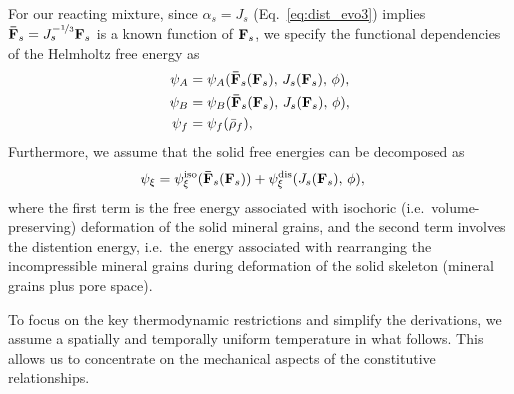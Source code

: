\documentclass[11pt]{article}
\begin{document}
For our reacting mixture, since $\alpha_s = J_s$ (Eq.~\eqref{eq:dist_evo3}) implies $\mathbf{\bar F}_s = J_s^{-\nicefrac{1}{3}} \mathbf{F}_s$ is a known function of $\mathbf{F}_s$, we specify the functional dependencies of the Helmholtz free energy as
%
\begin{align*}
  \psi_A &= \psi_A(\mathbf{\bar F}_s(\mathbf{F}_s),\, J_s(\mathbf{F}_s),\, \phi), \\
  \psi_B &= \psi_B(\mathbf{\bar F}_s(\mathbf{F}_s),\, J_s(\mathbf{F}_s),\, \phi), \\
  \psi_f &= \psi_f(\bar\rho_f),
\end{align*}
%
Furthermore, we assume that the solid free energies can be decomposed as
%
\begin{align*}
  \psi_\xi &= \psi_\xi^{\text{iso}}(\mathbf{\bar F}_s(\mathbf{F}_s)) + \psi_\xi^{\text{dis}}(J_s(\mathbf{F}_s),\, \phi),
\end{align*}
%
where the first term is the free energy associated with isochoric (i.e.\ volume-preserving) deformation of the solid mineral grains, and the second term involves the distention energy, i.e.\ the energy associated with rearranging the incompressible mineral grains during deformation of the solid skeleton (mineral grains plus pore space).

To focus on the key thermodynamic restrictions and simplify the derivations, we assume a spatially and temporally uniform temperature in what follows.  This allows us to concentrate on the mechanical aspects of the constitutive relationships.
\end{document}
